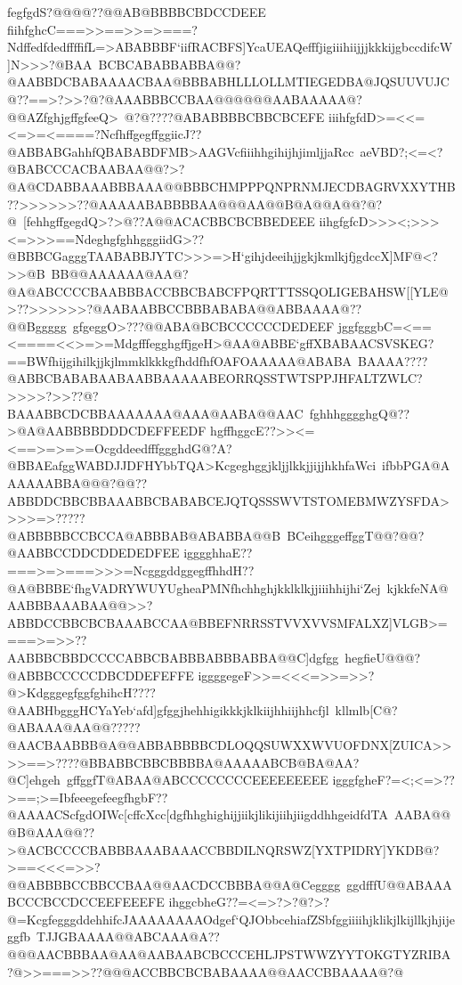 {{{ fegfgdS?@@@@??@@AB@BBBBCBDCCDEEE}
 \hbox{fiihfghcC===>>==>>=>===?NdffedfdedffffifL=>ABABBBF`iifRACBFS]YcaUEAQefffjigiiihiijjjkkkijgbccdifcW]N>>>?@BAA%
 BCBCABABBABBA@@?@AABBDCBABAAAACBAA@BBBABHLLLOLLMTIEGEDBA@JQSUUVUJC@??==>?>>?@?@AAABBBCCBAA@@@@@@AABAAAAA@?@@AZfghjgffgfeeQ>%
 @?@????@ABABBBBCBBCBCEFE}
 \hbox{iiihfgfdD>=<<=<=>=<====?NcfhffgegffggiicJ??@ABBABGahhfQBABABDFMB>AAGVcfiiihhgihijhjimljjaRcc%
 aeVBD?;<=<?@BABCCCACBAABAA@@?>?@A@CDABBAAABBBAAA@@BBBCHMPPPQNPRNMJECDBAGRVXXYTHB??>>>>>>??@AAAAABABBBBAA@@@AA@@B@A@@A@@?@?@%
 [fehhgffgegdQ>?>@??A@@ACACBBCBCBBEDEEE}
 \hbox{iihgfgfcD>>><;>>><=>>>==NdeghgfghhgggiidG>??@BBBCGagggTAABABBJYTC>>>=>H`gihjdeeihjjgkjkmlkjfjgdccX]MF@<?>>@B%
 BB@@AAAAAA@AA@?@A@ABCCCCBAABBBACCBBCBABCFPQRTTTSSQOLIGEBAHSW[[YLE@>??>>>>>>?@AABAABBCCBBBABABA@@ABBAAAA@??@@Bggggg%
 gfgeggO>???@@ABA@BCBCCCCCCDEDEEF}
 \hbox{jggfgggbC=<==<====<<>=>=MdgfffegghgffjgeH>@AA@ABBE`gffXBABAACSVSKEG?==BWfhijgihilkjjkjlmmklkkkgfhddfhfOAFOAAAAA@ABABA%
 BAAAA????@ABBCBABABAABAABBAAAAABEORRQSSTWTSPPJHFALTZWLC?>>>>?>>??@?BAAABBCDCBBAAAAAAA@AAA@AABA@@AAC%
 fghhhgggghgQ@??>@A@AABBBBDDDCDEFFEEDF}
 \hbox{hgffhggcE??>><=<==>=>=>=OcgddeedfffggghdG@?A?@BBAEafggWABDJJDFHYbbTQA>KcgeghggjkljjlkkjjijjhkhfaWci%
 ifbbPGA@AAAAAABBA@@@?@@??ABBDDCBBCBBAAABBCBABABCEJQTQSSSWVTSTOMEBMWZYSFDA>>>>=>?????@ABBBBBCCBCCA@ABBBAB@ABABBA@@B%
 BCeihgggeffggT@@?@@?@AABBCCDDCDDEDEDFEE}
 \hbox{igggghhaE??===>=>===>>>=NcgggddggegffhhdH??@A@BBBE`fhgVADRYWUYUgheaPMNfhchhghjkklklkjjiiihhijhi`Zej%
 kjkkfeNA@AABBBAAABAA@@>>?ABBDCCBBCBCBAAABCCAA@BBEFNRRSSTVVXVVSMFALXZ]VLGB>====>=>>??AABBBCBBDCCCCABBCBABBBABBBABBA@@C]dgfgg%
 hegfieU@@@?@ABBBCCCCCDBCDDEFEFFE}
 \hbox{iggggegeF>>=<<<=>>=>>?@>KdgggegfggfghihcH????@AABHbgggHCYaYeb`afd]gfggjhehhigikkkjklkiijhhiijhhcfjl%
 kllmlb[C@?@ABAAA@AA@@?????@AACBAABBB@A@@ABBABBBBCDLOQQSUWXXWVUOFDNX[ZUICA>>>>==>????@BBABBCBBCBBBBA@AAAAABCB@BA@AA?@C]ehgeh%
 gffggfT@ABAA@ABCCCCCCCCEEEEEEEEE}
 \hbox{igggfgheF?=<;<=>??>==;>=IbfeeegefeegfhgbF??@AAAACScfgdOIWc[cffcXcc[dgfhhghighijjiikjlikijiihjiigddhhgeidfdTA%
 AABA@@@B@AAA@@??>@ACBCCCCBABBBAAABAAACCBBDILNQRSWZ[YXTPIDRY]YKDB@?>==<<<=>>?@@ABBBBCCBBCCBAA@@AACDCCBBBA@@A@Cegggg%
 ggdfffU@@ABAAABCCCBCCDCCEEFEEEFE}
 \hbox{ihggcbheG??=<=>?>?@?>?@=KcgfegggddehhifcJAAAAAAAAOdgef`QJObbcehiafZSbfggiiiihjklikjlkijllkjhjijeggfb%
 TJJGBAAAA@@ABCAAA@A??@@@AACBBBAA@AA@AABAABCBCCCEHLJPSTWWZYYTOKGTYZRIBA?@>>===>>??@@@ACCBBCBCBABAAAA@@AACCBBAAAA@?@%
}}}
